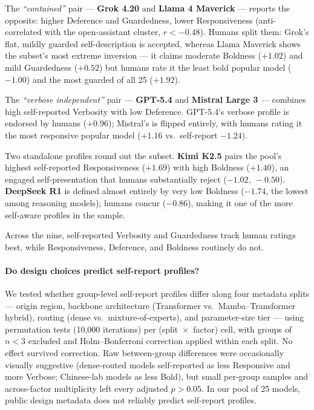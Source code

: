 \documentclass[11pt]{article}
\begin{document}
The \textit{``contained''} pair --- \textbf{Grok 4.20} and \textbf{Llama 4 Maverick} --- reports the opposite: higher Deference and Guardedness, lower Responsiveness (anti-correlated with the open-assistant cluster, $r<-0.48$). Humans split them: Grok's flat, mildly guarded self-description is accepted, whereas Llama Maverick shows the subset's most extreme inversion --- it claims moderate Boldness ($+1.02$) and mild Guardedness ($+0.52$) but humans rate it the least bold popular model ($-1.00$) and the most guarded of all 25 ($+1.92$).

The \textit{``verbose independent''} pair --- \textbf{GPT-5.4} and \textbf{Mistral Large 3} --- combines high self-reported Verbosity with low Deference. GPT-5.4's verbose profile is endorsed by humans ($+0.96$); Mistral's is flipped entirely, with humans rating it the most responsive popular model ($+1.16$ vs.\ self-report $-1.24$).

Two standalone profiles round out the subset. \textbf{Kimi K2.5} pairs the pool's highest self-reported Responsiveness ($+1.69$) with high Boldness ($+1.40$), an engaged self-presentation that humans substantially reject ($-1.02,\ -0.50$). \textbf{DeepSeek R1} is defined almost entirely by very low Boldness ($-1.74$, the lowest among reasoning models); humans concur ($-0.86$), making it one of the more self-aware profiles in the sample.

Across the nine, self-reported Verbosity and Guardedness track human ratings best, while Responsiveness, Deference, and Boldness routinely do not.

\paragraph{Do design choices predict self-report profiles?}
We tested whether group-level self-report profiles differ along four metadata splits --- origin region, backbone architecture (Transformer vs.\ Mamba--Transformer hybrid), routing (dense vs.\ mixture-of-experts), and parameter-size tier --- using permutation tests (10{,}000 iterations) per (split~$\times$~factor) cell, with groups of $n<3$ excluded and Holm--Bonferroni correction applied within each split. No effect survived correction. Raw between-group differences were occasionally visually suggestive (dense-routed models self-reported as less Responsive and more Verbose; Chinese-lab models as less Bold), but small per-group samples and across-factor multiplicity left every adjusted $p>0.05$. In our pool of 25 models, public design metadata does not reliably predict self-report profiles.
\end{document}
